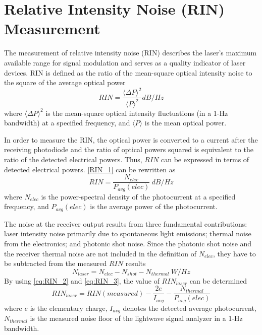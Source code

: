 \section{Relative Intensity Noise (RIN) Measurement}\label{sec:RIN_measurement}
The measurement of relative intensity noise (RIN) describes the laser’s maximum available range for signal modulation and serves as a quality indicator of laser devices. RIN is defined as the ratio of the mean-square optical intensity noise to the square of the average optical power \cite{petermann2012laser}
\begin{equation}
    RIN=\frac{\langle \Delta P \rangle ^2}{\langle P \rangle ^2}dB/Hz
\label{RIN_1}
\end{equation}
where $\langle \Delta P \rangle ^2$ is the mean-square optical intensity fluctuations (in a 1-Hz bandwidth) at a specified frequency, and $\langle P \rangle$ is the mean optical power.

In order to measure the RIN, the optical power is converted to a current after the receiving photodiode and the ratio of optical powers squared is equivalent to the ratio of the detected electrical powers. Thus, $RIN$ can be expressed in terms of detected electrical powers. \autoref{RIN_1} can be rewritten as
\begin{equation}
    RIN=\frac{N_{elec}}{P_{avg}(elec)} \ dB/Hz
    \label{eq:RIN_2}
\end{equation}
where $N_{elec}$ is the power-spectral density of the photocurrent at a specified frequency, and $P_{avg}(elec)$ is the average power of the photocurrent.

The noise at the receiver output results from three fundamental contributions: laser intensity noise primarily due to spontaneous light emissions; thermal noise from the electronics; and photonic shot noise. Since the photonic shot noise and the receiver thermal noise are not included in the definition of $N_{elec}$, they have to be subtracted from the measured $RIN$ results
\begin{equation}
    N_{laser}=N_{elec}-N_{shot}-N_{thermal} \ W/Hz
    \label{eq:RIN_3}
\end{equation}
By using \autoref{eq:RIN_2} and \autoref{eq:RIN_3}, the value of $RIN_{laser}$ can be determined
\begin{equation}
    RIN_{laser}=RIN(measured)-\frac{2e}{I_{avg}}-\frac{N_{thermal}}{P_{avg}(elec)}
    \label{eq:RIN_4}
\end{equation}
where $e$ is the elementary charge, $I_{avg}$ denotes the detected average photocurrent, $N_{thermal}$ is the measured noise floor of the lightwave signal analyzer in a 1-Hz bandwidth.

